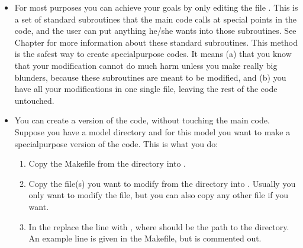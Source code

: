 \documentclass[letterpaper,10pt,english]{sphinxmanual}
\begin{document}
\begin{itemize}
\item {} 
For most purposes you can achieve your goals by only editing the file
. This is a set of standard subroutines
that the main code calls at special points in the code, and the user can
put anything he/she wants into those subroutines. See Chapter {\hyperref[\detokenize{internalsetup:chap-internal-setup}]{}}
for more information about these standard
subroutines. This method is the safest way to create special\sphinxhyphen{}purpose
codes. It means (a) that you know that your modification cannot do much
harm unless you make really big blunders, because these subroutines are
meant to be modified, and (b) you have all your modifications 
in one single file, leaving the rest of the code untouched.

\item {} 
You can create a  version of the code, without touching
the main code. Suppose you have a model directory  and for
this model you want to make a special\sphinxhyphen{}purpose version of the code.
This is what you do:
\begin{enumerate}
%
\item {} 
Copy the Makefile from the  directory into .

\item {} 
Copy the  file(s) you want to modify from the 
directory into . Usually you only want to modify
the  file, but you can also copy any other
file if you want.

\item {} 
In the  replace the  line with
, where  should
be the  path to the  directory. An example line
is given in the Makefile, but is commented out.


\end{enumerate}
\end{itemize}
\end{document}
